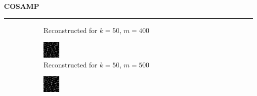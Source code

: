 \documentclass[a4paper,12pt]{article}
\newenvironment{solution}[2][]{%
    \begin{mdframed}[linecolor=blue!70!black, linewidth=2pt, roundcorner=10pt, backgroundcolor=yellow!10!white, skipabove=12pt, skipbelow=12pt]%
        \textbf{\large #2}
        \par\noindent\rule{\textwidth}{0.4pt}
}{
    \end{mdframed}
}
\begin{document}
\begin{solution}{COSAMP}
\begin{figure}[H]
\begin{subfigure}[t]{0.23\textwidth}
            \caption{Reconstructed for $k = 50$, $m = 400$}
        \end{subfigure}
        \begin{subfigure}[t]{0.23\textwidth}
            \centering
            \includegraphics[width=\textwidth]{../images/cosamp/Reconstructed_k_50_m_500.png}
            \caption{Reconstructed for $k = 50$, $m = 500$}
        \end{subfigure}
        \begin{subfigure}[t]{0.23\textwidth}
            \centering
            \includegraphics[width=\textwidth]{../images/cosamp/Reconstructed_k_50_m_600.png}

\end{subfigure}
\end{figure}
\end{solution}
\end{document}
